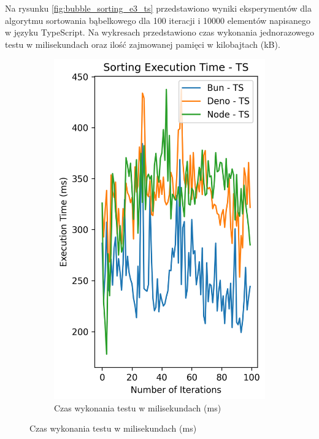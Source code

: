 Na rysunku \ref{fig:bubble_sorting_e3_ts} przedstawiono wyniki eksperymentów dla algorytmu sortowania bąbelkowego dla 100 iteracji i 10000 elementów napisanego w języku TypeScript. Na wykresach przedstawiono czas wykonania jednorazowego testu w milisekundach oraz ilość zajmowanej pamięci w kilobajtach (kB).

\begin{figure}[H]
  \centering
  \begin{subfigure}[b]{0.42\textwidth}
    \centering
    \includegraphics[width=\textwidth]{Figures/sorting/sorting_bubble_100_10000_ts_time.png}
    \caption{Czas wykonania testu w milisekundach (ms)}
    \label{fig:bubble_sorting_e3_ts_time}

\end{subfigure}
\end{figure}

